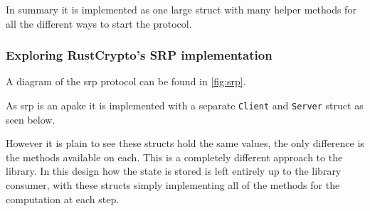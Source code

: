 In summary it is implemented as one large struct with many helper methods for all the different ways to start the protocol.

\subsubsection{Exploring RustCrypto's SRP implementation}
A diagram of the \gls{srp} protocol can be found in \cref{fig:srp}.

As \gls{srp} is an \gls{apake} it is implemented with a separate \texttt{Client} and \texttt{Server} struct as seen below.


However it is plain to see these structs hold the same values, the only difference is the methods available on each.
This is a completely different approach to the  library.
In this design how the state is stored is left entirely up to the library consumer, with these structs simply implementing all of the methods for the computation at each step.



